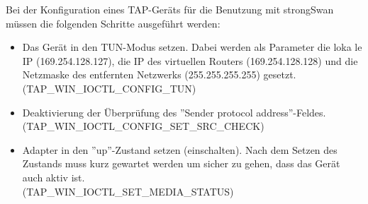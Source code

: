 Bei der Konfiguration eines TAP-Geräts für die Benutzung mit strongSwan müssen die folgenden
Schritte ausgeführt werden:
\begin{itemize}
\item Das Gerät in den TUN-Modus setzen. Dabei werden als Parameter
die loka le IP (169.254.128.127), die IP des virtuellen Routers (169.254.128.128)
und die Netzmaske des entfernten Netzwerks (255.255.255.255) gesetzt. 
(TAP\_WIN\_IOCTL\_CONFIG\_TUN)
\item Deaktivierung der Überprüfung des ''Sender protocol address''-Feldes.\\
(TAP\_WIN\_IOCTL\_CONFIG\_SET\_SRC\_CHECK)
\item Adapter in den ''up''-Zustand setzen (einschalten). 
Nach dem Setzen des Zustands muss kurz gewartet werden um sicher zu gehen, dass das Gerät auch aktiv ist.\\
(TAP\_WIN\_IOCTL\_SET\_MEDIA\_STATUS)
\end{itemize}

